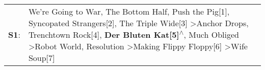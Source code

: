 \begin{supertabular}{p{0.03\textwidth}p{0.92\textwidth}}
 \textbf{S1}:  &  We're Going to War\textsuperscript{}, \enspace The Bottom Half\textsuperscript{}, \enspace Push the Pig[1]\textsuperscript{}, \enspace Syncopated Strangers[2]\textsuperscript{}, \enspace The Triple Wide[3]\textsuperscript{} \textgreater \enspace Anchor Drops\textsuperscript{}, \enspace Trenchtown Rock[4]\textsuperscript{}, \enspace \textbf{Der Bluten Kat[5]\textsuperscript{$\wedge$}}, \enspace Much Obliged\textsuperscript{} \textgreater \enspace Robot World\textsuperscript{}, \enspace Resolution\textsuperscript{} \textgreater \enspace Making Flippy Floppy[6]\textsuperscript{} \textgreater \enspace Wife Soup[7]\textsuperscript{}  \enspace  \\
\end{supertabular}
